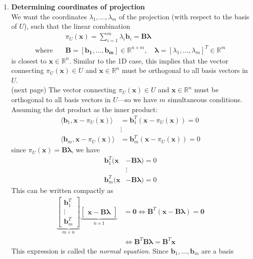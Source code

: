 \documentclass{report}
\begin{document}
\begin{enumerate}
\item\textbf{Determining coordinates of projection}\\
We want the coordinates $\lambda_1,\ldots,\lambda_m$ of the projection (with respect to the basis of $U$), 
such that the linear combination
\begin{align*}
&\pi_U(\bm{x})=\sum^m_{i=1}\lambda_i\bm{b}_i=\bm{B\lambda}\\
\text{where}\quad&\bm{B}=[\bm{b_1},\ldots,\bm{b_m}]\in\mathbb{R}^{n\times m},\quad\bm{\lambda}
=[\lambda_1,\ldots,\lambda_m]^T\in\mathbb{R}^m
\end{align*}
is closest to $\bm{x}\in\mathbb{R}^n$. Similar to the 1D case, this implies that
the vector connecting $\pi_U(\bm{x})\in U$ and $\bm{x}\in\mathbb{R}^n$ must be orthogonal to all
basis vectors in $U$.\\
(next page)
\newpage
\noindent The vector connecting $\pi_U(\bm{x})\in U$ and $\bm{x}\in\mathbb{R}^n$ must be orthogonal to all
basis vectors in $U$---so we have $m$ simultaneous conditions. Assuming the dot product as the inner product:
\begin{align*}
\langle\bm{b}_1,\bm{x}-\pi_U(\bm{x})\rangle&=
\bm{b}_1^T(\bm{x}-\pi_U(\bm{x}))=0\\
&\vdots\\
\langle\bm{b}_m,\bm{x}-\pi_U(\bm{x})\rangle&=
\bm{b}_m^T(\bm{x}-\pi_U(\bm{x}))=0
\end{align*}
since $\pi_U(\bm{x})=\bm{B\lambda}$, we have
\begin{align*}
\bm{b}_1^T(\bm{x}&-\bm{B\lambda})=0\\
&\vdots\\
\bm{b}_m^T(\bm{x}&-\bm{B\lambda})=0
\end{align*}
This can be written compactly as
\begin{align*}
\underbrace{\begin{bmatrix}
\bm{b}_1^T\\\vdots\\\bm{b}_m^T
\end{bmatrix}}_{m\times n}
\underbrace{\begin{bmatrix}
\bm{x}-\bm{B\lambda}
\end{bmatrix}}_{n\times1}&=\bm{0}
\iff\bm{B}^T(\bm{x}-\bm{B\lambda})=\bm{0}\\
&\iff\bm{B}^T\bm{B\lambda}=\bm{B}^T\bm{x}
\end{align*}
This expression is called the \textit{normal equation}. Since $\bm{b}_1,\ldots,\bm{b}_m$ are a basis 

\end{enumerate}
\end{document}
